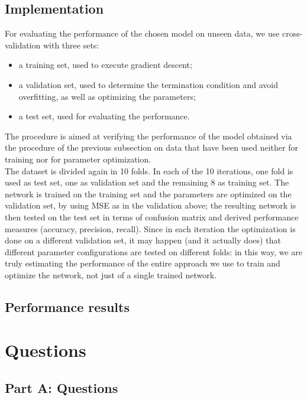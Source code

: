 \documentclass{article}
\begin{document}
\subsection{Implementation}
For evaluating the performance of the chosen model on unseen data, we use cross-validation with three sets:
\begin{itemize}
	\item a training set, used to execute gradient descent;
	\item a validation set, used to determine the termination condition and avoid overfitting, as well as optimizing the parameters;
	\item a test set, used for evaluating the performance.
\end{itemize}
The procedure is aimed at verifying the performance of the model obtained via the procedure of the previous subsection on data that have been used neither for training nor for parameter optimization.\\
The dataset is divided again in 10 folds. In each of the 10 iterations, one fold is used as test set, one as validation set and the remaining 8 as training set. The network is trained on the training set and the parameters are optimized on the validation set, by using MSE as in the validation above; the resulting network is then tested on the test set in terms of confusion matrix and derived performance measures (accuracy, precision, recall). Since in each iteration the optimization is done on a different validation set, it may happen (and it actually does) that different parameter configurations are tested on different folds: in this way, we are truly estimating the performance of the entire approach we use to train and optimize the network, not just of a single trained network.

\subsection{Performance results}


\section{Questions}
\subsection{Part A: Questions}
\end{document}
